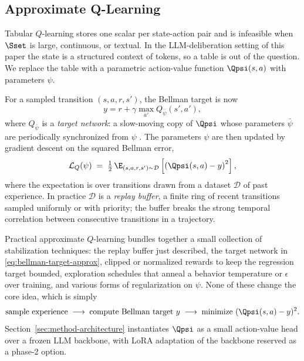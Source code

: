 \subsection{Approximate Q-Learning}
\label{sec:background-approxq}

Tabular $Q$-learning stores one scalar per state-action pair and is
infeasible when $\Sset$ is large, continuous, or textual. In the
LLM-deliberation setting of this paper the state is a structured context
of tokens, so a table is out of the question. We replace the table with a
parametric action-value function $\Qpsi(s, a)$ with parameters $\psi$.

For a sampled transition $(s, a, r, s')$, the Bellman target is now
\begin{equation}
y = r + \gamma \max_{a'} Q_{\bar{\psi}}(s', a'),
\label{eq:bellman-target-approx}
\end{equation}
where $Q_{\bar{\psi}}$ is a \emph{target network}: a slow-moving copy of
$\Qpsi$ whose parameters $\bar{\psi}$ are periodically synchronized from
$\psi$ \citep{mnih2015human}. The parameters $\psi$ are then updated by
gradient descent on the squared Bellman error,
\begin{equation}
\mathcal{L}_Q(\psi) \;=\; \tfrac{1}{2}\,
\E_{(s, a, r, s') \sim \mathcal{D}}
\left[ \left( \Qpsi(s, a) - y \right)^2 \right],
\label{eq:approx-q-loss}
\end{equation}
where the expectation is over transitions drawn from a dataset
$\mathcal{D}$ of past experience. In practice $\mathcal{D}$ is a
\emph{replay buffer}, a finite ring of recent transitions sampled
uniformly or with priority; the buffer breaks the strong temporal
correlation between consecutive transitions in a trajectory.

Practical approximate $Q$-learning bundles together a small collection of
stabilization techniques: the replay buffer just described, the target
network in \eqref{eq:bellman-target-approx}, clipped or normalized
rewards to keep the regression target bounded, exploration schedules that
anneal a behavior temperature or $\epsilon$ over training, and various
forms of regularization on $\psi$. None of these change the core idea,
which is simply
\begin{equation}
\text{sample experience} \;\longrightarrow\;
\text{compute Bellman target}~y \;\longrightarrow\;
\text{minimize } (\Qpsi(s, a) - y)^2.
\label{eq:approxq-loop}
\end{equation}
Section~\ref{sec:method-architecture} instantiates $\Qpsi$ as a small
action-value head over a frozen LLM backbone, with LoRA adaptation
\citep{hu2022lora} of the backbone reserved as a phase-2 option.

